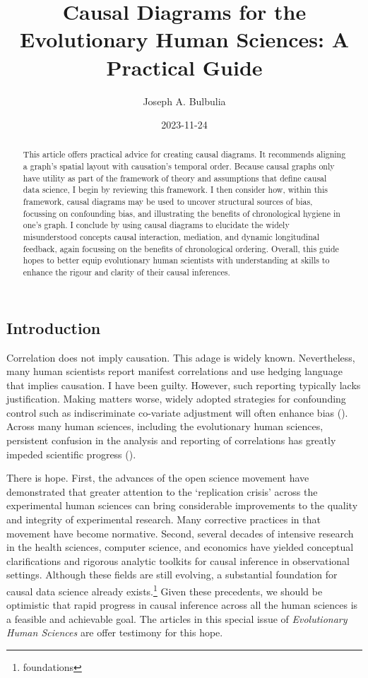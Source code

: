 \documentclass[
  singlecolumn,
  9pt]{article}
\title{Causal Diagrams for the Evolutionary Human Sciences: A Practical
Guide}
\author{Joseph A. Bulbulia}
\affil{%
                  Victoria University of Wellington, New Zealand, School
                  of Psychology, Centre for Applied Cross-Cultural
                  Research
              }
\date{2023-11-24}
\begin{document}
\maketitle
\begin{abstract}
This article offers practical advice for creating causal diagrams. It
recommends aligning a graph's spatial layout with causation's temporal
order. Because causal graphs only have utility as part of the framework
of theory and assumptions that define causal data science, I begin by
reviewing this framework. I then consider how, within this framework,
causal diagrams may be used to uncover structural sources of bias,
focussing on confounding bias, and illustrating the benefits of
chronological hygiene in one's graph. I conclude by using causal
diagrams to elucidate the widely misunderstood concepts causal
interaction, mediation, and dynamic longitudinal feedback, again
focussing on the benefits of chronological ordering. Overall, this guide
hopes to better equip evolutionary human scientists with understanding
at skills to enhance the rigour and clarity of their causal inferences.
\end{abstract}
\subsection{Introduction}\label{introduction}

Correlation does not imply causation. This adage is widely known.
Nevertheless, many human scientists report manifest correlations and use
hedging language that implies causation. I have been guilty. However,
such reporting typically lacks justification. Making matters worse,
widely adopted strategies for confounding control such as indiscriminate
co-variate adjustment will often enhance bias
(). Across many human
sciences, including the evolutionary human sciences, persistent
confusion in the analysis and reporting of correlations has greatly
impeded scientific progress ().

There is hope. First, the advances of the open science movement have
demonstrated that greater attention to the `replication crisis' across
the experimental human sciences can bring considerable improvements to
the quality and integrity of experimental research. Many corrective
practices in that movement have become normative. Second, several
decades of intensive research in the health sciences, computer science,
and economics have yielded conceptual clarifications and rigorous
analytic toolkits for causal inference in observational settings.
Although these fields are still evolving, a substantial foundation for
causal data science already exists.\footnote{foundations} Given these
precedents, we should be optimistic that rapid progress in causal
inference across all the human sciences is a feasible and achievable
goal. The articles in this special issue of \emph{Evolutionary Human
Sciences} are offer testimony for this hope.
\end{document}
